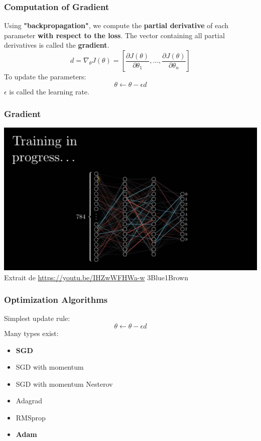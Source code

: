 \documentclass[english,usenames,dvipsnames]{beamer}
\begin{document}
\begin{frame}
	\frametitle{Computation of Gradient}
	Using \textbf{"backpropagation"}, we compute the \textbf{partial derivative} of each parameter \textbf{with respect to the loss}. The vector containing all partial derivatives is called the \textbf{gradient}.
	$$d = \nabla_\theta J(\theta) = \left[\frac{\partial J(\theta)}{\partial \theta_1}, \dots, \frac{\partial J(\theta)}{\partial \theta_n}\right]$$
	To update the parameters:
	$$\theta \leftarrow \theta - \epsilon d$$
	$\epsilon$ is called the learning rate.
\end{frame}


\begin{frame}
	\frametitle{Gradient}
	\includegraphics[scale=0.47]{gradient-signal.pdf}\\
	{\tiny Extrait de \url{https://youtu.be/IHZwWFHWa-w} 3Blue1Brown}
\end{frame}


\begin{frame}
	\frametitle{Optimization Algorithms}
	Simplest update rule:
	$$\theta \leftarrow \theta - \epsilon d$$
	Many types exist:
	\begin{itemize}
		\item \textbf{SGD}
		\item SGD with momentum
		\item SGD with momentum Nesterov
		\item Adagrad
		\item RMSprop
		\item \textbf{Adam}
	\end{itemize}
\end{frame}
\end{document}
